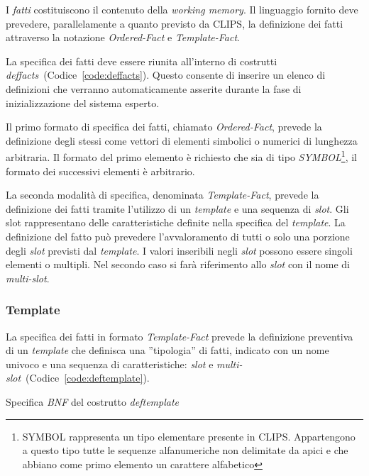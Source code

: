 I \emph{fatti} costituiscono il contenuto della \emph{working memory}. Il linguaggio fornito deve prevedere, parallelamente a quanto previsto da CLIPS, la definizione dei fatti attraverso la notazione \emph{Ordered-Fact} e \emph{Template-Fact}.

La specifica dei fatti deve essere riunita all'interno di costrutti \emph{deffacts}~(Codice~\ref{code:deffacts}). Questo consente di inserire un elenco di definizioni che verranno automaticamente asserite durante la fase di inizializzazione del sistema esperto.

Il primo formato di specifica dei fatti, chiamato \emph{Ordered-Fact}, prevede la definizione degli stessi come vettori di elementi simbolici o numerici di lunghezza arbitraria. Il formato del primo elemento è richiesto che sia di tipo \emph{SYMBOL}\footnote{SYMBOL rappresenta un tipo elementare presente in CLIPS. Appartengono a questo tipo tutte le sequenze alfanumeriche non delimitate da apici e che abbiano come primo elemento un carattere alfabetico}, il formato dei successivi elementi è arbitrario.

La seconda modalità di specifica, denominata \emph{Template-Fact}, prevede la definizione dei fatti tramite l'utilizzo di un \emph{template} e una sequenza di \emph{slot}. Gli slot rappresentano delle caratteristiche definite nella specifica del \emph{template}.
La definizione del fatto può prevedere l'avvaloramento di tutti o solo una porzione degli \emph{slot} previsti dal \emph{template}.
I valori inseribili negli \emph{slot} possono essere singoli elementi o multipli. Nel secondo caso si farà riferimento allo \emph{slot} con il nome di \emph{multi-slot}.

\subsubsection{Template}\label{par:linguaggio-template}

La specifica dei fatti in formato \emph{Template-Fact} prevede la definizione preventiva di un \emph{template} che definisca una ''tipologia'' di fatti, indicato con un nome univoco e una sequenza di caratteristiche: \emph{slot} e \emph{multi-slot}~(Codice~\ref{code:deftemplate}).

\begin{program}
\caption{Specifica \emph{BNF} del costrutto  \emph{deftemplate}}\label{code:deftemplate}
\end{program}


